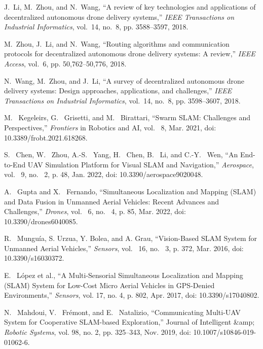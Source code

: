 \documentclass[conference]{IEEEtran}
\begin{document}
\begin{thebibliography}{1}

J.~Li, M.~Zhou, and N.~Wang, ``A review of key technologies and applications of decentralized autonomous drone delivery systems,'' \emph{IEEE Transactions on Industrial Informatics}, vol.~14, no.~8, pp. 3588--3597, 2018.

M.~Zhou, J.~Li, and N.~Wang, ``Routing algorithms and communication protocols for decentralized autonomous drone delivery systems: A review,'' \emph{IEEE Access}, vol.~6, pp. 50,762--50,776, 2018.

N.~Wang, M.~Zhou, and J.~Li, ``A survey of decentralized autonomous drone delivery systems: Design approaches, applications, and challenges,'' \emph{IEEE Transactions on Industrial Informatics}, vol.~14, no.~8, pp. 3598--3607, 2018.

M. ~Kegeleirs, G. ~Grisetti, and M. ~Birattari, “Swarm SLAM: Challenges and Perspectives,” \emph{Frontiers} in Robotics and AI, vol. ~8, Mar. 2021, doi: 10.3389/frobt.2021.618268.

S. ~Chen, W. ~Zhou, A.-S. ~Yang, H. ~Chen, B. ~Li, and C.-Y. ~Wen, “An End-to-End UAV Simulation Platform for Visual SLAM and Navigation,” \emph{Aerospace}, vol. ~9, no. ~2, p. 48, Jan. 2022, doi: 10.3390/aerospace9020048.

A. ~Gupta and X. ~Fernando, “Simultaneous Localization and Mapping (SLAM) and Data Fusion in Unmanned Aerial Vehicles: Recent Advances and Challenges,” \emph{Drones}, vol. ~6, no. ~4, p. 85, Mar. 2022, doi: 10.3390/drones6040085.

R. ~Munguía, S. Urzua, Y. Bolea, and A. Grau, “Vision-Based SLAM System for Unmanned Aerial Vehicles,” \emph{Sensors}, vol. ~16, no. ~3, p. 372, Mar. 2016, doi: 10.3390/s16030372.

E. ~López et al., “A Multi-Sensorial Simultaneous Localization and Mapping (SLAM) System for Low-Cost Micro Aerial Vehicles in GPS-Denied Environments,” \emph{Sensors}, vol. 17, no. 4, p. 802, Apr. 2017, doi: 10.3390/s17040802.

N. ~Mahdoui, V. ~Frémont, and E. ~Natalizio, “Communicating Multi-UAV System for Cooperative SLAM-based Exploration,” Journal of Intelligent &amp; \emph{Robotic Systems}, vol. 98, no. 2, pp. 325–343, Nov. 2019, doi: 10.1007/s10846-019-01062-6.


\end{thebibliography}
\end{document}
